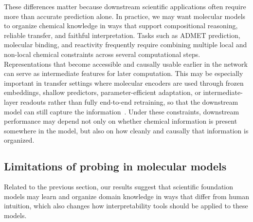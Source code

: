 These differences matter because downstream scientific applications often require more than accurate prediction alone. In practice, we may want molecular models to organize chemical knowledge in ways that support compositional reasoning, reliable transfer, and faithful interpretation. Tasks such as ADMET prediction, molecular binding, and reactivity frequently require combining multiple local and non-local chemical constraints across several computational steps. Representations that become accessible and causally usable earlier in the network can serve as intermediate features for later computation. This may be especially important in transfer settings where molecular encoders are used through frozen embeddings, shallow predictors, parameter-efficient adaptation, or intermediate-layer readouts rather than fully end-to-end retraining, so that the downstream model can still capture the information~\cite{honda2019smiles,rollins2024molprop,cai2026chemfm,harod2025effichem,pinto2025unlocking}. Under these constraints, downstream performance may depend not only on whether chemical information is present somewhere in the model, but also on how cleanly and causally that information is organized.


\subsection{Limitations of probing in molecular models}

Related to the previous section, our results suggest that scientific foundation models may learn and organize domain knowledge in ways that differ from human intuition, which also changes how interpretability tools should be applied to these models. 

